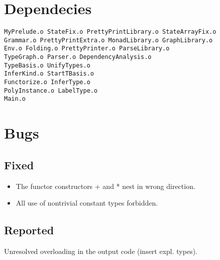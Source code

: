 \documentclass[A4]{article}
\begin{document}
\section{Dependecies}
\begin{verbatim}
MyPrelude.o StateFix.o PrettyPrintLibrary.o StateArrayFix.o
Grammar.o PrettyPrintExtra.o MonadLibrary.o GraphLibrary.o
Env.o Folding.o PrettyPrinter.o ParseLibrary.o
TypeGraph.o Parser.o DependencyAnalysis.o
TypeBasis.o UnifyTypes.o
InferKind.o StartTBasis.o
Functorize.o InferType.o
PolyInstance.o LabelType.o
Main.o
\end{verbatim}
\section{Bugs}
\subsection{Fixed}
\begin{itemize}
\item The functor constructors + and * nest in wrong direction.
\item All use of nontrivial constant types forbidden.
\end{itemize}
\subsection{Reported}
\item Unresolved overloading in the output code (insert expl. types).
\end{document}
